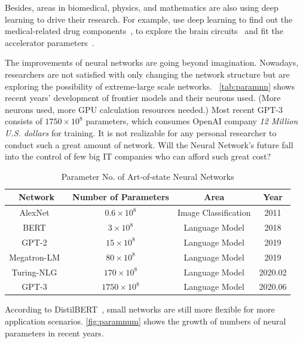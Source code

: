 \begin{spacing}{1.5}
Besides, areas in biomedical, physics, and mathematics are also using deep learning to drive their research. For example, use deep learning to find out the medical-related drug components~\cite{ma2015deep}, to explore the brain circuits~\cite{helmstaedter2013connectomic} and fit the accelerator parameters~\cite{ciodaro2012online}.

The improvements of neural networks are going beyond imagination. Nowadays, researchers are not satisfied with only changing the network structure but are exploring the possibility of extreme-large scale networks. ~\autoref{tab:paramnn} shows recent years' development of frontier models and their neurons used. (More neurons used, more GPU calculation resources needed.) Most recent GPT-3 consists of $1750 \times {10}^8$ parameters, which consumes OpenAI company \textit{12 Million U.S. dollars} for training. It is not realizable for any personal researcher to conduct such a great amount of network. Will the Neural Network's future fall into the control of few big IT companies who can afford such great cost?

\begin{table}[ht]
\caption{Parameter No. of Art-of-state Neural Networks}
\label{tab:paramnn}
\begin{tabular}{cccc}
\toprule
\textbf{Network} & \textbf{Number of Parameters} & \textbf{Area}        & \textbf{Year} \\ \midrule
AlexNet~\cite{krizhevsky2012imagenet}     & $0.6 \times {10}^{8}$ & Image Classification & 2011     \\
BERT~\cite{Jacob2018BERT}        & $3 \times {10}^{8}$   & Language Model       & 2018     \\
GPT-2~\cite{radford2019language}       & $15 \times {10}^{8}$  & Language Model       & 2019     \\
Megatron-LM~\cite{Shoebi2019MegatronLM} & $80 \times {10}^{8}$  & Language Model       & 2019     \\
Turing-NLG~\cite{tnlg}  & $170 \times {10}^{8}$ & Language Model       & 2020.02 \\
GPT-3~\cite{brown2020language}       & $1750 \times {10}^{8}$  & Language Model       & 2020.06 \\ \bottomrule
\end{tabular}
\end{table}

According to DistilBERT~\cite{sanh2019distilbert}, small networks are still more flexible for more application scenarios. \autoref{fig:paramnum} shows the growth of numbers of neural parameters in recent years.


\end{spacing}
